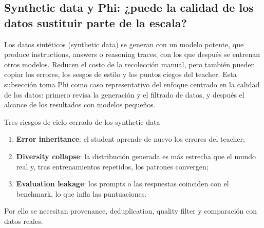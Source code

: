 
\subsection{Synthetic data y Phi: ¿puede la calidad de los datos sustituir parte de la escala?}

Los datos sintéticos (synthetic data) se generan con un modelo potente, que produce instructions, answers o reasoning traces, con los que después se entrenan otros modelos. Reducen el costo de la recolección manual, pero también pueden copiar los errores, los sesgos de estilo y los puntos ciegos del teacher. Esta subsección toma Phi como caso representativo del enfoque centrado en la calidad de los datos: primero revisa la generación y el filtrado de datos, y después el alcance de los resultados con modelos pequeños.


\begin{warningbox}{Tres riesgos de ciclo cerrado de los synthetic data}
\begin{enumerate}
  \item \textbf{Error inheritance}: el student aprende de nuevo los errores del teacher;
  \item \textbf{Diversity collapse}: la distribución generada es más estrecha que el mundo real y, tras entrenamientos repetidos, los patrones convergen;
  \item \textbf{Evaluation leakage}: los prompts o las respuestas coinciden con el benchmark, lo que infla las puntuaciones.
\end{enumerate}
Por ello se necesitan provenance, deduplication, quality filter y comparación con datos reales.
\end{warningbox}



